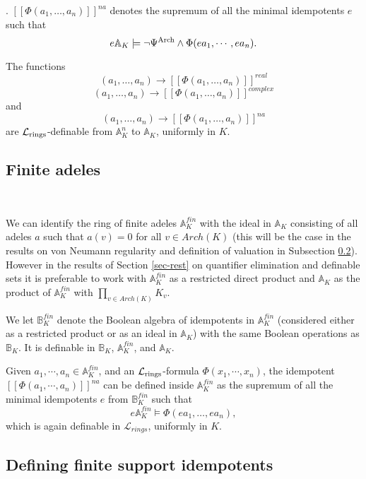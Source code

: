 \documentclass[12pt]{amsart}
\def\A{\mathbb{A}}
\def\B{\mathbb{B}}
\def\cL{\mathcal{L}}
\def\cL{\mathcal{L}}
\numberwithin{equation}{section}
\begin{document}
. $[[\Phi(a_1,\dots,a_n)]]^{na}$ denotes the supremum of all the minimal idempotents $e$ such that 
$$e\Bbb A_K\models \neg \Psi^{\mathrm{Arch}} \wedge \Phi(ea_1,\cdots,ea_n).$$ 

The functions $$(a_1,\dots,a_n)\rightarrow [[\Phi(a_1,\dots,a_n)]]^{real}$$ 
$$(a_1,\dots,a_n)\rightarrow [[\Phi(a_1,\dots,a_n)]]^{complex}$$ 
and $$(a_1,\dots,a_n)\rightarrow [[\Phi(a_1,\dots,a_n)]]^{na}$$ 
are $\cL_{\rm{rings}}$-definable from $\A_K^n$ to $\A_K$, uniformly in $K$.

\medskip

\subsection{\bf Finite adeles}\label{sec-fin} 

\

\medskip

We can identify the ring of finite adeles $\A_K^{fin}$ with the ideal in $\A_K$ consisting of all adeles $a$ such that $a(v)=0$ for all $v\in Arch(K)$ (this will be the case in the results 
on von Neumann regularity and definition of valuation in Subsection 
\ref{ssec-deffin}). However in the results of Section \ref{sec-rest} on quantifier elimination and definable sets it is preferable to work with $\A_K^{fin}$ as a restricted direct product and $\A_K$ as the product of $\A_K^{fin}$ with $\prod_{v\in Arch(K)} K_v$. 

We let $\B_K^{fin}$ denote the Boolean algebra of idempotents in $\A_K^{fin}$ (considered either as a restricted product or as an ideal in $\A_K$) 
with the same Boolean operations as $\B_K$. It is definable in $\B_K$, $\A_K^{fin}$, and $\A_K$.

Given $a_1,\cdots,a_n\in \A_{K}^{fin}$, and an $\cL_{\rm{rings}}$-formula $\Phi(x_1,\cdots,x_n)$, the idempotent 
$[[\Phi(a_1,\cdots,a_n)]]^{na}$ can be defined inside $\A_K^{fin}$ as the supremum of all the 
minimal idempotents $e$ from $\B_K^{fin}$ such that 
$$e\A_{K}^{fin} \models \Phi(ea_1,\dots,ea_n),$$ 
which is again definable in $\cL_{rings}$, uniformly in $K$.

\medskip

\subsection{\bf Defining finite support idempotents}\label{ssec-deffin} 

\

\medskip
\end{document}
